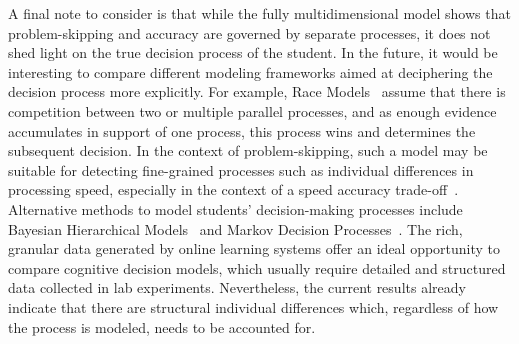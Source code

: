 \documentclass[11pt]{article}
\begin{document}


A final note to consider is that while the fully multidimensional model shows that problem-skipping and accuracy are governed by separate processes, it does not shed light on the true decision process of the student. In the future, it would be interesting to compare different modeling frameworks aimed at deciphering the decision process more explicitly. For example, Race Models~\parencite{heathcote2022winner} assume that there is competition between two or multiple parallel processes, and as enough evidence accumulates in support of one process, this process wins and determines the subsequent decision. In the context of problem-skipping, such a model may be suitable for detecting fine-grained processes such as individual differences in processing speed, especially in the context of a speed accuracy trade-off~\parencite{heathcote2022winner, evans2018modeling}. Alternative methods to model students' decision-making processes include Bayesian Hierarchical Models~\parencite{sawyer2018modeling, lee2014bayesian} and Markov Decision Processes~\parencite{lamar2018markov, puterman1994markov}. The rich, granular data generated by online learning systems offer an ideal opportunity to compare cognitive decision models, which usually require detailed and structured data collected in lab experiments. Nevertheless, the current results already indicate that there are structural individual differences which, regardless of how the process is modeled, needs to be accounted for.
\end{document}
